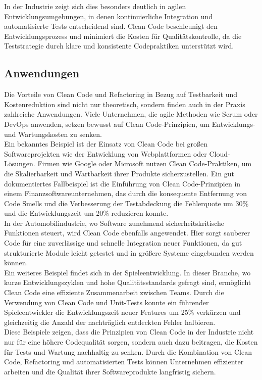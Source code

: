 \documentclass[conference]{IEEEtran}
\begin{document}
In der Industrie zeigt sich dies besonders deutlich in agilen Entwicklungsumgebungen, in denen kontinuierliche Integration und automatisierte Tests entscheidend sind. Clean Code beschleunigt den Entwicklungsprozess und minimiert die Kosten für Qualitätskontrolle, da die Teststrategie durch klare und konsistente Codepraktiken unterstützt wird.

\subsection{Anwendungen}

Die Vorteile von Clean Code und Refactoring in Bezug auf Testbarkeit und Kostenreduktion sind nicht nur theoretisch, sondern finden auch in der Praxis zahlreiche Anwendungen. Viele Unternehmen, die agile Methoden wie Scrum oder DevOps anwenden, setzen bewusst auf Clean Code-Prinzipien, um Entwicklungs- und Wartungskosten zu senken.\\

Ein bekanntes Beispiel ist der Einsatz von Clean Code bei großen Softwareprojekten wie der Entwicklung von Webplattformen oder Cloud-Lösungen. Firmen wie Google oder Microsoft nutzen Clean Code-Praktiken, um die Skalierbarkeit und Wartbarkeit ihrer Produkte sicherzustellen. Ein gut dokumentiertes Fallbeispiel ist die Einführung von Clean Code-Prinzipien in einem Finanzsoftwareunternehmen, das durch die konsequente Entfernung von Code Smells und die Verbesserung der Testabdeckung die Fehlerquote um 30\% und die Entwicklungszeit um 20\% reduzieren konnte.\\

In der Automobilindustrie, wo Software zunehmend sicherheitskritische Funktionen steuert, wird Clean Code ebenfalls angewendet. Hier sorgt sauberer Code für eine zuverlässige und schnelle Integration neuer Funktionen, da gut strukturierte Module leicht getestet und in größere Systeme eingebunden werden können.\\

Ein weiteres Beispiel findet sich in der Spieleentwicklung. In dieser Branche, wo kurze Entwicklungszyklen und hohe Qualitätsstandards gefragt sind, ermöglicht Clean Code eine effiziente Zusammenarbeit zwischen Teams. Durch die Verwendung von Clean Code und Unit-Tests konnte ein führender Spieleentwickler die Entwicklungszeit neuer Features um 25\% verkürzen und gleichzeitig die Anzahl der nachträglich entdeckten Fehler halbieren.\\

Diese Beispiele zeigen, dass die Prinzipien von Clean Code in der Industrie nicht nur für eine höhere Codequalität sorgen, sondern auch dazu beitragen, die Kosten für Tests und Wartung nachhaltig zu senken. Durch die Kombination von Clean Code, Refactoring und automatisierten Tests können Unternehmen effizienter arbeiten und die Qualität ihrer Softwareprodukte langfristig sichern.
\end{document}
